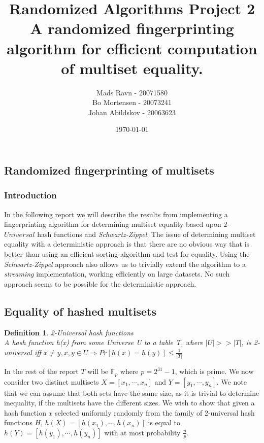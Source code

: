 \documentclass[article,a4paper,oneside]{article}
\newtheorem{definition}{Definition}
\newcommand{\+}[1]{\ensuremath{\boldsymbol{#1}}}
\begin{document}
\title{
Randomized Algorithms Project 2\\
A randomized fingerprinting algorithm for efficient computation of multiset equality.
}

\author{
  Mads Ravn - 20071580\\
  Bo Mortensen - 20073241\\
  Johan Abildskov - 20063623
}

\date{\today}

\maketitle

\newpage

\subsection*{Randomized fingerprinting of multisets}
\subsubsection*{Introduction}
In the following report we will describe the results from implementing a fingerprinting algorithm for determining multiset equality based upon $2$-$Universal$ hash functions and \emph{Schwartz-Zippel}.
The issue of determining multiset equality with a deterministic approach is that there are no obvious way that is better than using an efficient sorting algorithm and test for equality. Using the \emph{Schwartz-Zippel} approach also allows us to trivially extend the algorithm to a \emph{streaming} implementation, working efficiently on large datasets. No such approach seems to be possible for the deterministic approach.

\subsection*{Equality of hashed multisets}
\begin{definition}{2-Universal hash functions}\\
A hash function h(x) from some Universe \emph{U} to a table {T}, where $|U| >> |T|$, is 2\emph{-}universal iff $x \neq y, x,y \in U \Rightarrow Pr[h(x) = h(y)] \leq \frac{1}{|T|}$
\end{definition}
In the rest of the report $T$ will be $\mathbb{F}_p$ where $p = 2^{31} - 1$, which is prime.
We now consider two distinct multisets $X = \left[x_1,\cdots, x_n\right]$ and $Y = \left[y_1, \cdots, y_n\right]$. We note that we can assume that both sets have the same size, as it is trivial to determine inequality, if the multisets have the different sizes.
We wish to show that given a hash function $x$ selected uniformly randomly from the family of 2-universal hash functions $H$, $h(X) = \left[h(x_1),\cdots, h(x_n)\right]$ is equal to $h(Y) = \left[h(y_1),\cdots,h(y_n)\right]$ with at most probability $\frac{n}{p}$.
\end{document}
